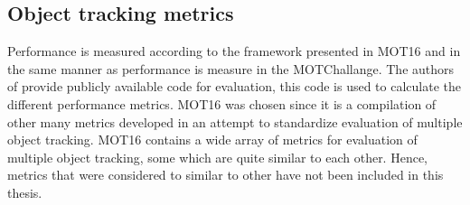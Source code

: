 \subsection{Object tracking metrics}
Performance is measured according to the framework presented in MOT16 \cite{DBLP:journals/corr/MilanL0RS16} and in the same manner as performance is measure in the MOTChallange. The authors of \cite{DBLP:journals/corr/MilanL0RS16} provide publicly available code for evaluation, this code is used to calculate the different performance metrics. MOT16 was chosen since it is a compilation of other many metrics developed in an attempt to standardize evaluation of multiple object tracking. MOT16 contains a wide array of metrics for evaluation of multiple object tracking, some which are quite similar to each other. Hence, metrics that were considered to similar to other have not been included in this thesis.

